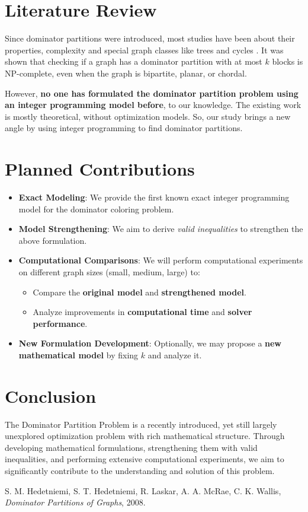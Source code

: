 \documentclass[12pt]{article}
\begin{document}
\section{Literature Review}

Since dominator partitions were introduced, most studies have been about their properties, complexity and special graph classes like trees and cycles \cite{dominator_partitions}. It was shown that checking if a graph has a dominator partition with at most $k$ blocks is NP-complete, even when the graph is bipartite, planar, or chordal.

However, \textbf{no one has formulated the dominator partition problem using an integer programming model before}, to our knowledge. The existing work is mostly theoretical, without optimization models. So, our study brings a new angle by using integer programming to find dominator partitions.

\clearpage



\section{Planned Contributions}
\begin{itemize}[leftmargin=*, noitemsep]
    \item \textbf{Exact Modeling}: We provide the first known exact integer programming model for the dominator coloring problem.
    \item \textbf{Model Strengthening}: We aim to derive \textit{valid inequalities} to strengthen the above formulation.
    \item \textbf{Computational Comparisons}: We will perform computational experiments on different graph sizes (small, medium, large) to:
    \begin{itemize}[noitemsep]
        \item Compare the \textbf{original model} and \textbf{strengthened model}.
        \item Analyze improvements in \textbf{computational time} and \textbf{solver performance}.
    \end{itemize}
    \item \textbf{New Formulation Development}: Optionally, we may propose a \textbf{new mathematical model} by fixing $k$ and analyze it.
\end{itemize}

\section{Conclusion}
The Dominator Partition Problem is a recently introduced, yet still largely unexplored optimization problem with rich mathematical structure. Through developing mathematical formulations, strengthening them with valid inequalities, and performing extensive computational experiments, we aim to significantly contribute to the understanding and solution of this problem.


\clearpage

\begin{thebibliography}{9}

S. M. Hedetniemi, S. T. Hedetniemi, R. Laskar, A. A. McRae, C. K. Wallis,
\textit{Dominator Partitions of Graphs}, 2008.

\end{thebibliography}
\end{document}

